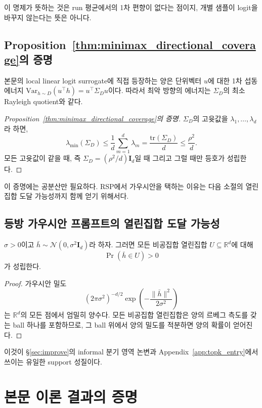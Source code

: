 이 명제가 뜻하는 것은 run 평균에서의 1차 편향이 없다는 점이지, 개별 샘플이 logit을 바꾸지 않는다는 뜻은 아니다.

\subsection{Proposition~\ref{thm:minimax_directional_coverage}의 증명}

본문의 local linear logit surrogate에 직접 등장하는 양은 단위벡터 $u$에 대한 1차 섭동 에너지 $\mathrm{Var}_{h\sim D}(u^\top h)=u^\top\Sigma_D u$이다. 따라서 최악 방향의 에너지는 $\Sigma_D$의 최소 Rayleigh quotient와 같다.

\begin{proof}[Proposition~\ref{thm:minimax_directional_coverage}의 증명]
$\Sigma_D$의 고윳값을 $\lambda_1,\dots,\lambda_d$라 하면,
\[
\lambda_{\min}(\Sigma_D)
\le
\frac{1}{d}\sum_{m=1}^{d}\lambda_m
=
\frac{\mathrm{tr}(\Sigma_D)}{d}
\le
\frac{\rho^2}{d}.
\]
모든 고윳값이 같을 때, 즉 $\Sigma_D = (\rho^2/d)\mathbf{I}_d$일 때 그리고 그럴 때만 등호가 성립한다.
\end{proof}

이 증명에는 공분산만 필요하다. RSP에서 가우시안을 택하는 이유는 다음 소절의 열린집합 도달 가능성까지 함께 얻기 위해서다.

\subsection{등방 가우시안 프롬프트의 열린집합 도달 가능성}

\begin{proposition}\label{prop:gaussian_open_support}
$\sigma>0$이고 $\bar h \sim \mathcal{N}(0,\sigma^2\mathbf{I}_d)$라 하자. 그러면 모든 비공집합 열린집합 $U \subseteq \mathbb{R}^d$에 대해
\[
\Pr(\bar h \in U) > 0
\]
가 성립한다.
\end{proposition}

\begin{proof}
가우시안 밀도
\[
(2\pi \sigma^2)^{-d/2}\exp\!\left(-\frac{\|\bar h\|^2}{2\sigma^2}\right)
\]
는 $\mathbb{R}^d$의 모든 점에서 엄밀히 양수다. 모든 비공집합 열린집합은 양의 르베그 측도를 갖는 ball 하나를 포함하므로, 그 ball 위에서 양의 밀도를 적분하면 양의 확률이 얻어진다.
\end{proof}

이것이 \S\ref{sec:improve}의 informal 분기 영역 논변과 Appendix~\ref{app:topk_entry}에서 쓰이는 유일한 support 성질이다.

\clearpage
\section{본문 이론 결과의 증명}\label{app:proofs}

